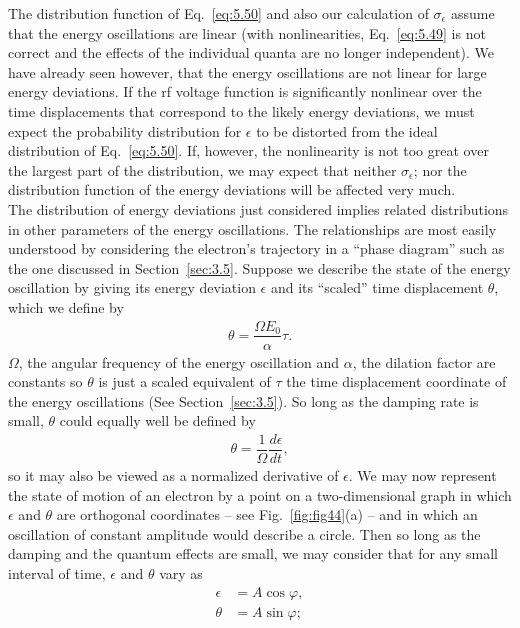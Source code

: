 The distribution function of Eq.~\eqref{eq:5.50} and also our calculation of $\sigma_\epsilon$ assume that the energy oscillations are linear (with nonlinearities, Eq.~\eqref{eq:5.49} is not
correct and the effects of the individual quanta are no longer independent). We have already seen however, that the energy oscillations are not linear for large energy deviations. If the rf voltage function is significantly nonlinear over the time displacements that correspond to the likely energy deviations, we must expect the probability distribution for $\epsilon$ to be distorted from the ideal distribution of Eq.~\eqref{eq:5.50}. If, however, the nonlinearity
 is not too great over the largest part of the distribution, we may expect that neither $\sigma_\epsilon$; nor the distribution function of the energy deviations will be affected very much.\\
The distribution of energy deviations just considered implies related distributions in other parameters of the energy oscillations. The relationships are most easily understood by considering the electron's trajectory in a ``phase diagram'' such as the one discussed in Section~\ref{sec:3.5}. Suppose we describe the state of the energy oscillation by giving its energy deviation $\epsilon$ and its ``scaled'' time displacement $\theta$, which we define by
\begin{align} \label{eq:5.52}
	\theta = \dfrac{\Omega E_0}{\alpha} \tau.
\end{align}
$\Omega$, the angular frequency of the energy oscillation and $\alpha$, the dilation factor are
constants so $\theta$ is just a scaled equivalent of $\tau$ the time displacement coordinate of
the energy oscillations (See Section~\ref{sec:3.5}). So long as the damping rate is small, $\theta$ could equally well be defined by
\begin{align}
	\theta = \dfrac{1}{\Omega} \dfrac{d\epsilon}{dt},
\end{align}
so it may also be viewed as a normalized derivative of $\epsilon$. We may now represent the state of motion of an electron by a point on a two-dimensional graph in which $\epsilon$ and $\theta$ are orthogonal coordinates -- see Fig.~\ref{fig:fig44}(a) -- and in which an oscillation
of constant amplitude would describe a circle. Then so long as the damping and the quantum effects are small, we may consider that for any small interval of time, $\epsilon$ and $\theta$ vary as
\begin{align}
	\epsilon &= A \cos\varphi,\\
    \theta &= A \sin\varphi;
\end{align}
